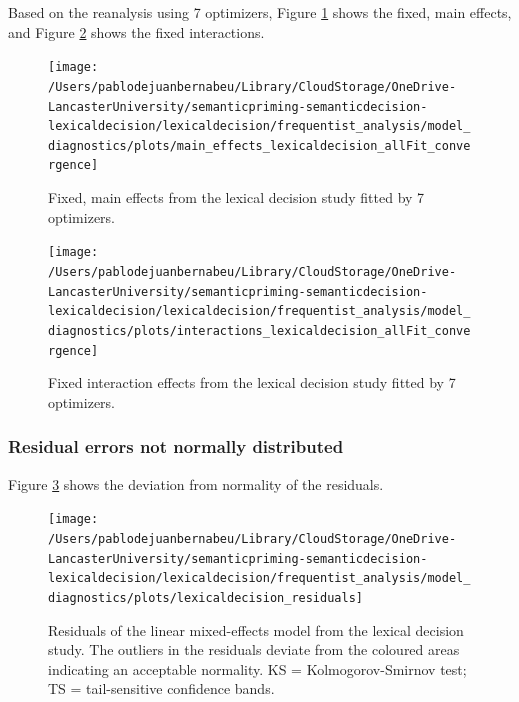 \documentclass[
  12pt,
  man,floatsintext]{apa7}
\begin{document}
Based on the reanalysis using 7 optimizers, Figure \ref{fig:main-effects-lexicaldecision-allFit-convergence} shows the fixed, main effects, and Figure \ref{fig:interactions-lexicaldecision-allFit-convergence} shows the fixed interactions.

\begin{figure}

{\centering \texttt{[image: /Users/pablodejuanbernabeu/Library/CloudStorage/OneDrive-LancasterUniversity/semanticpriming-semanticdecision-lexicaldecision/lexicaldecision/frequentist\_analysis/model\_diagnostics/plots/main\_effects\_lexicaldecision\_allFit\_convergence]} 

}

\caption{Fixed, main effects from the lexical decision study fitted by 7 optimizers.}\label{fig:main-effects-lexicaldecision-allFit-convergence}
\end{figure}

\begin{figure}

{\centering \texttt{[image: /Users/pablodejuanbernabeu/Library/CloudStorage/OneDrive-LancasterUniversity/semanticpriming-semanticdecision-lexicaldecision/lexicaldecision/frequentist\_analysis/model\_diagnostics/plots/interactions\_lexicaldecision\_allFit\_convergence]} 

}

\caption{Fixed interaction effects from the lexical decision study fitted by 7 optimizers.}\label{fig:interactions-lexicaldecision-allFit-convergence}
\end{figure}

\hypertarget{residual-errors-not-normally-distributed-4}{%
\subsubsection{Residual errors not normally distributed}\label{residual-errors-not-normally-distributed-4}}

Figure \ref{fig:lexicaldecision-residuals} shows the deviation from normality of the residuals.

\begin{figure}

{\centering \texttt{[image: /Users/pablodejuanbernabeu/Library/CloudStorage/OneDrive-LancasterUniversity/semanticpriming-semanticdecision-lexicaldecision/lexicaldecision/frequentist\_analysis/model\_diagnostics/plots/lexicaldecision\_residuals]} 

}

\caption{Residuals of the linear mixed-effects model from the lexical decision study. The outliers in the residuals deviate from the coloured areas indicating an acceptable normality. \linebreak KS = Kolmogorov-Smirnov test; TS = tail-sensitive confidence bands.}\label{fig:lexicaldecision-residuals}
\end{figure}
\end{document}
